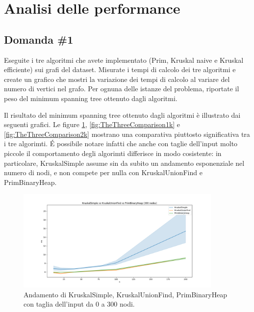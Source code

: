 \section{Analisi delle performance}
\label{cap:performance-analysis}

\subsection{Domanda \#1}

\begin{displayquote}
Eseguite i tre algoritmi che avete implementato (Prim, Kruskal naive e Kruskal efficiente) sui grafi del dataset. Misurate i tempi di calcolo dei tre algoritmi e create un grafico che mostri la variazione dei tempi di calcolo al variare del numero di vertici nel grafo. Per ognuna delle istanze del problema, riportate il peso del minimum spanning tree ottenuto dagli algoritmi.
\end{displayquote}

\noindent Il risultato del minimum spanning tree ottenuto dagli algoritmi è illustrato dai seguenti
grafici. Le figure \ref{fig:TheThreeComparison300}, \ref{fig:TheThreeComparison1k}
e \ref{fig:TheThreeComparison2k} mostrano una comparativa piuttosto significativa tra i tre algorimti.
\'E possibile notare infatti che anche con taglie dell'input molto piccole il comportamento degli 
algorimti differisce in modo cosistente: in particolare, KruskalSimple assume sin da subito un
andamento esponenziale nel numero di nodi, e non compete per nulla con KruskalUnionFind e PrimBinaryHeap.

\begin{figure}[H]
    \centering
    \includegraphics[width=0.9\textwidth]{./images/KruskalSimple_vs_KruskalUnionFind_vs_PrimBinaryHeap_(300_nodes).png}
	\caption{Andamento di KruskalSimple, KruskalUnionFind, PrimBinaryHeap con taglia dell'input da 0 a 300 nodi.}
    \label{fig:TheThreeComparison300}
\end{figure}

